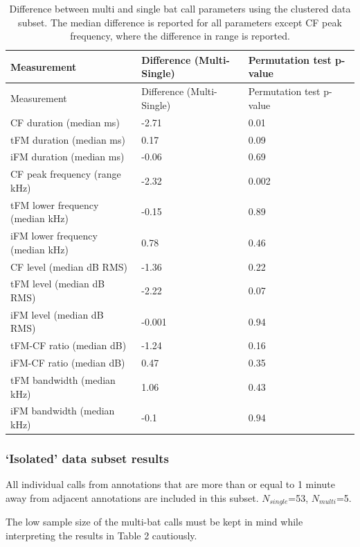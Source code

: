 \documentclass[
]{book}
\begin{document}
\begin{longtable}[]{@{}lll@{}}
\caption{\label{tab:indcallclustered} Difference between multi and single bat call parameters using the clustered data subset. The median difference is reported for all parameters except CF peak frequency, where the difference in range is reported.}\tabularnewline
\toprule
Measurement & Difference (Multi-Single) & Permutation test p-value\tabularnewline
\midrule
\endfirsthead
\toprule
Measurement & Difference (Multi-Single) & Permutation test p-value\tabularnewline
\midrule
\endhead
CF duration (median ms) & -2.71 & 0.01\tabularnewline
tFM duration (median ms) & 0.17 & 0.09\tabularnewline
iFM duration (median ms) & -0.06 & 0.69\tabularnewline
CF peak frequency (range kHz) & -2.32 & 0.002\tabularnewline
tFM lower frequency (median kHz) & -0.15 & 0.89\tabularnewline
iFM lower frequency (median kHz) & 0.78 & 0.46\tabularnewline
CF level (median dB RMS) & -1.36 & 0.22\tabularnewline
tFM level (median dB RMS) & -2.22 & 0.07\tabularnewline
iFM level (median dB RMS) & -0.001 & 0.94\tabularnewline
tFM-CF ratio (median dB) & -1.24 & 0.16\tabularnewline
iFM-CF ratio (median dB) & 0.47 & 0.35\tabularnewline
tFM bandwidth (median kHz) & 1.06 & 0.43\tabularnewline
iFM bandwidth (median kHz) & -0.1 & 0.94\tabularnewline
\bottomrule
\end{longtable}

\hypertarget{isolated-data-subset-results}{%
\subsubsection{`Isolated' data subset results}\label{isolated-data-subset-results}}

All individual calls from annotations that are more than or equal to 1 minute away from adjacent annotations are included in this subset. \(N_{single}\)=53, \(N_{multi}\)=5.

The low sample size of the multi-bat calls must be kept in mind while interpreting the results in Table 2 cautiously.
\end{document}
